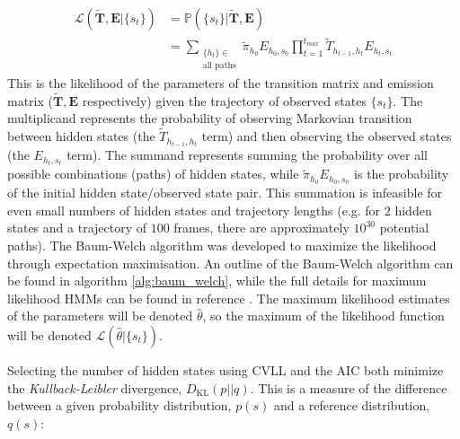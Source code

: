 \begin{equation}\label{eqn:obs_lik_full}
\begin{split}
    \mathcal{L}\left(\tilde{\mathbf{T}}, \mathbf{E}| \{s_t\}\right) & = \mathbb{P}\left(\{s_t\} | \tilde{\mathbf{T}}, \mathbf{E}\right) \\
    & = \sum_{\substack{\{h_t\} \in \\ \text{all paths}}} \tilde{\pi}_{h_{0}}E_{h_{0},s_{0}}\prod_{t=1}^{t_{max}}\tilde{T}_{h_{t-1}, h_t}E_{h_t, s_t}    
\end{split}
\end{equation}
This is the likelihood of the parameters of the transition matrix and emission matrix ($\tilde{\mathbf{T}}, \mathbf{E}$ respectively) given the trajectory of observed states $\{s_t\}$. The multiplicand represents the probability of observing Markovian transition between hidden states (the $\tilde{T}_{h_{t-1}, h_{t}}$ term) and then  observing the observed states (the $E_{h_t, s_t}$ term). The summand represents summing the probability over all possible combinations (paths) of hidden states, while $\tilde{\pi}_{h_{0}}E_{ h_{0}, s_{0}}$ is the probability of the initial hidden state/observed state pair. This summation is infeasible for even small numbers of hidden states and trajectory lengths (e.g. for $2$ hidden states and a trajectory of $100$ frames, there are approximately $10^{30}$ potential paths). The Baum-Welch algorithm \cite{rabinerTutorialHiddenMarkov1989} was developed to maximize the likelihood through expectation maximisation. An outline of the Baum-Welch algorithm can be found in algorithm \ref{alg:baum_welch}, while the full details for maximum likelihood HMMs can be found in reference \cite{noeProjectedHiddenMarkov2013a}. The maximum likelihood estimates of the parameters will be denoted $\hat{\theta}$, so the maximum of the likelihood function will be denoted $\mathcal{L}\left(\hat{\theta}|\{s_t\}\right)$. 

Selecting the number of hidden states using CVLL and the AIC both minimize the \emph{Kullback-Leibler} divergence, $D_{\mathrm{KL}}(p||q)$\cite{mclachlanFiniteMixtureModels2000}. This is a measure of the difference between a given probability distribution, $p(s)$ and a reference distribution, $q(s)$: 

